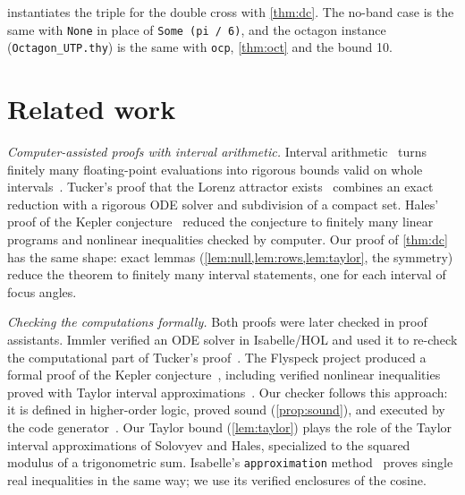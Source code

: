 \documentclass[11pt]{amsart}
\theoremstyle{plain}
\theoremstyle{definition}
\newcommand{\thy}[1]{\texttt{#1}}
\begin{document}


 instantiates the triple for the double cross with \cref{thm:dc}.  The no-band case
is the same with \thy{None} in place of \thy{Some (pi / 6)}, and the octagon instance
(\thy{Octagon\_UTP.thy}) is the same with \thy{ocp}, \cref{thm:oct} and the bound 10.



\section{Related work}\label{sec:related}

\emph{Computer-assisted proofs with interval arithmetic.}  Interval arithmetic~\cite{Moore1966} turns
finitely many floating-point evaluations into rigorous bounds valid on whole intervals~\cite{Tucker2011}.
Tucker's proof that the Lorenz attractor exists~\cite{Tucker1999,Tucker2002} combines an exact reduction
with a rigorous ODE solver and subdivision of a compact set.  Hales' proof of the Kepler
conjecture~\cite{Hales2005} reduced the conjecture to finitely many linear programs and nonlinear
inequalities checked by computer.  Our proof of \cref{thm:dc} has the same shape: exact lemmas
(\cref{lem:null,lem:rows,lem:taylor}, the symmetry) reduce the theorem to finitely many interval
statements, one for each interval of focus angles.

\emph{Checking the computations formally.}  Both proofs were later checked in proof assistants.
Immler verified an ODE solver in Isabelle/HOL and used it to re-check the computational part of
Tucker's proof~\cite{Immler18}.  The Flyspeck project produced a formal proof of the Kepler
conjecture~\cite{Hales2017}, including verified nonlinear inequalities proved with Taylor interval
approximations~\cite{SolovyevH13}.  Our checker follows this approach: it is defined in higher-order
logic, proved sound (\cref{prop:sound}), and executed by the code generator~\cite{HaftmannN10}.  Our
Taylor bound (\cref{lem:taylor}) plays the role of the Taylor interval approximations of Solovyev and
Hales, specialized to the squared modulus of a trigonometric sum.  Isabelle's \thy{approximation}
method~\cite{Holzl2009} proves single real inequalities in the same way; we use its verified
enclosures of the cosine.
\end{document}
